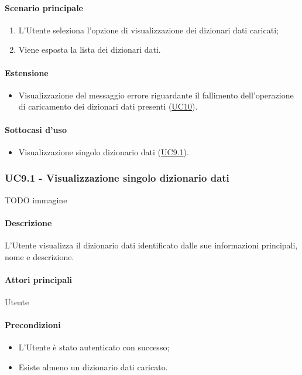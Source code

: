 \paragraph*{Scenario principale}
\begin{enumerate}
  \item L’Utente seleziona l’opzione di visualizzazione dei dizionari dati caricati;
  \item Viene esposta la lista dei dizionari dati.  
\end{enumerate}

\paragraph*{Estensione}
\begin{itemize}
  \item Visualizzazione del messaggio errore riguardante il fallimento dell’operazione di caricamento dei dizionari dati presenti (\hyperref[UC10]{UC10}).
\end{itemize}

\paragraph*{Sottocasi d'uso}
\begin{itemize}
  \item Visualizzazione singolo dizionario dati (\hyperref[UC9point1]{UC9.1}).
\end{itemize}

\subsubsection{UC9.1 - Visualizzazione singolo dizionario dati}\label{UC9point1}
TODO immagine\paragraph*{Descrizione}
L’Utente visualizza il dizionario dati identificato dalle sue informazioni principali, nome e descrizione.
\paragraph*{Attori principali} Utente
\paragraph*{Precondizioni}
\begin{itemize}
  \item L’Utente è stato autenticato con successo;
  \item Esiste almeno un dizionario dati caricato.  
\end{itemize}
